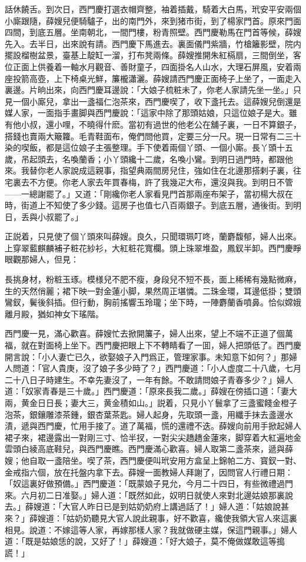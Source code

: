 話休饒舌。到次日，西門慶打選衣帽齊整，袖着插戴，騎着大白馬，玳安平安兩個小廝跟隨，薛嫂兒便騎驢子，出的南門外，來到猪市街，到了楊家門首。原來門面四間，到底五層。坐南朝北，一間門樓，粉青照壁。西門慶勒馬在門首等候，薛嫂先入。去半日，出來說有請。西門慶下馬進去。裏面儀門紫牆，竹槍籬影壁，院内擺設榴樹盆景，臺基上靛缸一溜，打布凳兩條。薛嫂推開朱紅槅扇，三間倒坐，客位正面上供養着一軸水月觀音、善財童子，四面掛名人山水，大理石屏風，安着兩座投箭高壺，上下椅桌光鮮，簾櫳瀟灑。薛嫂請西門慶正面椅子上坐了，一面走入裏邊。片晌出來，向西門慶耳邊說：「大娘子梳粧未了，你老人家請先坐一坐。」只見一個小廝兒，拿出一盞福仁泡茶來，西門慶喫了，收下盞托去。這薛嫂兒倒還是媒人家，一面指手畫脚與西門慶說：「這家中除了那頭姑娘，只這位娘子是大。雖有他小叔，還小哩，不曉得什麽。當初有過世的他老公在舖子裏，一日不算銀子，搭錢也賣兩大簸籮。毛青鞋面布，俺們問他買，定要三分一尺。現一日常有二三十染的喫飯，都是這位娘子主張整理。手下使着兩個丫頭、一個小廝。長丫頭十五歲，吊起頭去，名喚蘭香；小丫頭纔十二歲，名喚小鸞。到明日過門時，都跟他來。我替你老人家說成這親事，指望典兩間房兒住，強如住在北邊那搭剌子裏，往宅裏去不方便。你老人家去年買春梅，許了我幾疋大布，還沒與我。到明日不管——一總謝罷了。」又道：「剛纔你老人家看見門首那兩座布架子，當初楊大叔在時，街道上不知使了多少錢。這房子也值七八百兩銀子。到底五層，通後街。到明日，丢與小叔罷了。」

正説着，只見使了個丫頭來叫薛嫂。良久，只聞環珮叮咚，蘭麝馥郁，婦人出來。上穿翠藍麒麟補子粧花紗衫，大紅粧花寬欄。頭上珠翠堆盈，鳳釵半卸。西門慶睜眼觀那婦人，但見：

長挑身材，粉粧玉琢。模様兒不肥不瘦，身段兒不短不長，面上稀稀有幾點微麻，生的天然俏麗；裙下映一對金蓮小脚，果然周正堪憐。二珠金環，耳邊低掛；雙頭鸞釵，鬢後斜插。但行動，胸前搖響玉玲瓏；坐下時，一陣麝蘭香噴鼻。恰似嫦娥離月殿，猶如神女下瑤階。

西門慶一見，滿心歡喜。薛嫂忙去掀開簾子，婦人出來，望上不端不正道了個萬福，就在對面椅上坐下。西門慶把眼上下不轉睛看了一囬，婦人把頭低了。西門慶開言說：「小人妻亡已久，欲娶娘子入門爲正，管理家事。未知意下如何？」那婦人問道：「官人貴庚，沒了娘子多少時了？」西門慶道：「小人虚度二十八歲，七月二十八日子時建生。不幸先妻沒了，一年有餘。不敢請問娘子青春多少？」婦人道：「奴家青春是三十歲。」西門慶道：「原來長我二歲。」薛嫂在傍插口道：「妻大兩，黄金日日長；妻大三，黄金積如山。」説着，只見小丫鬟拿了三盞蜜餞金橙子泡茶，銀鑲雕漆茶鍾，銀杏葉茶匙。婦人起身，先取頭一盞，用纖手抹去盞邊水漬，遞與西門慶，忙用手接了。道了萬福，慌的還禮不迭。薛嫂向前用手掀起婦人裙子來，裙邊露出一對剛三寸、恰半扠，一對尖尖趫趫金蓮來，脚穿着大紅遍地金雲頭白綾高底鞋兒，與西門慶瞧。西門慶滿心歡喜。婦人取第二盞茶來，遞與薛嫂；他自取一盞陪坐。喫了茶，西門慶便叫玳安用方盒呈上錦帕二方、寳釵一對、金戒指六個，放在托盤内拿下去。薛嫂一面教婦人拜謝了，因問官人行禮日期：「奴這裏好做預備。」西門慶道：「既蒙娘子見允，今月二十四日，有些微禮過門來。六月初二日准娶。」婦人道：「既然如此，奴明日就使人來對北邊姑娘那裏說去。」薛嫂道：「大官人昨日已是到姑奶奶府上講過話了！」婦人道：「姑娘說甚來？」薛嫂道：「姑奶奶聽見大官人說此親事，好不歡喜，纔使我領大官人來這裏相見。說道：不嫁這等人家，再嫁那樣人家？我就做硬主媒，保這門親事。」婦人道：「既是姑娘恁的說，又好了！」薛嫂道：「好大娘子，莫不俺做媒敢這等搗謊！」

